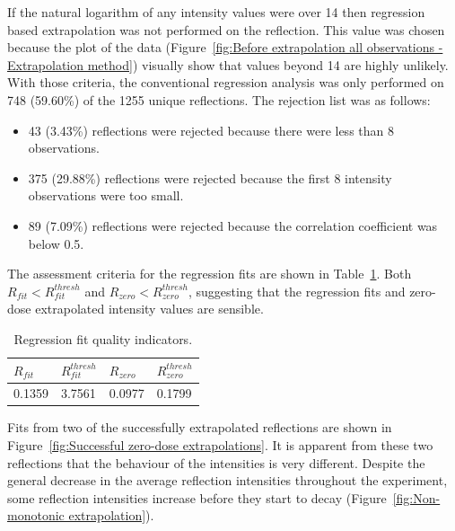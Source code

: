 If the natural logarithm of any intensity values were over 14 then regression based extrapolation was not performed on the reflection.
This value was chosen because the plot of the data (Figure~\ref{fig:Before extrapolation all observations - Extrapolation method}) visually show that values beyond 14 are highly unlikely.
With those criteria, the conventional regression analysis was only performed on 748 (59.60\%) of the 1255 unique reflections.
The rejection list was as follows:
\begin{itemize}
    \item 43 (3.43\%) reflections were rejected because there were less than 8 observations.
    \item 375 (29.88\%) reflections were rejected because the first 8 intensity observations were too small.
    \item 89 (7.09\%) reflections were rejected because the correlation coefficient was below 0.5.
\end{itemize}
The assessment criteria for the regression fits are shown in Table~\ref{tab:R_fit and R_zero values}.
Both $R_{fit} < R^{thresh}_{fit}$ and $R_{zero} < R^{thresh}_{zero}$, suggesting that the regression fits and zero-dose extrapolated intensity values are sensible.
\begin{table}[ht!]
	\caption[Regression fit quality indicators.]{Regression fit quality indicators.}
	\centering
	\begin{tabular}{p{1.5cm} | p{1.5cm} | p{1.5cm} | p{1.5cm}}
		$R_{fit}$     & $R^{thresh}_{fit}$    & $R_{zero}$   & $R^{thresh}_{zero}$  \\
		\hline
		0.1359        & 3.7561                & 0.0977       & 0.1799        \\
	\end{tabular}
	\label{tab:R_fit and R_zero values}
\end{table}
Fits from two of the successfully extrapolated reflections are shown in Figure~\ref{fig:Successful zero-dose extrapolations}.
It is apparent from these two reflections that the behaviour of the intensities is very different.
Despite the general decrease in the average reflection intensities throughout the experiment, some reflection intensities increase before they start to decay (Figure~\ref{fig:Non-monotonic extrapolation}).
